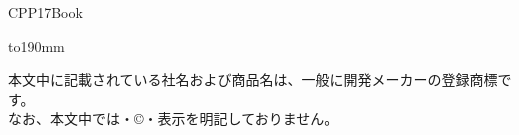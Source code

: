 %
\thispagestyle{empty}

CPP17Book

\pagebreak

%
\thispagestyle{frontheadings}

\vbox to190mm{
\vfil
\begin{minipage}[b]{112mm}
%
\begin{spacing}{1.0}
\begin{small}
本文中に記載されている社名および商品名は、一般に開発メーカーの登録商標です。\\
なお、本文中では\texttrademark ・\copyright ・\textregistered 表示を明記しておりません。
\end{small}
\end{spacing}
\end{minipage}
}

